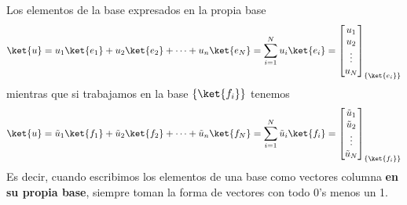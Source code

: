 \documentclass[a4paper,11pt]{book} %
\numberwithin{equation}{chapter}
\begin{document}
\begin{mybox_blue}{Los elementos de la base expresados en la propia base}
	\begin{equation*}
	\ket{u} = u_1 \ket{e_1} + u_2 \ket{e_2} + \dots + u_n \ket{e_N} = \sum_{i=1}^{N} u_i \ket{e_i} = 
	\begin{bmatrix}
	u_1 \\ u_2\\ \vdots \\ u_N
	\end{bmatrix}_{\{\ket{e_i}\}}
	\end{equation*}
mientras que si trabajamos en la base $\{\ket{f_i}\}$ tenemos
	\begin{equation*}
	\ket{u} = \tilde{u}_1 \ket{f_1} + \tilde{u}_2 \ket{f_2} + \dots + \tilde{u}_n \ket{f_N} = \sum_{i=1}^{N} \tilde{u}_i \ket{f_i} = 
	\begin{bmatrix}
	\tilde{u}_1 \\ \tilde{u}_2\\ \vdots \\ \tilde{u}_N
	\end{bmatrix}_{\{\ket{f_i}\}}
	\end{equation*}
	Es decir, cuando escribimos los elementos de una base como vectores columna \textbf{en su propia base}, siempre toman la forma de vectores con todo 0's menos un 1.
	\end{mybox_blue}
\end{document}
